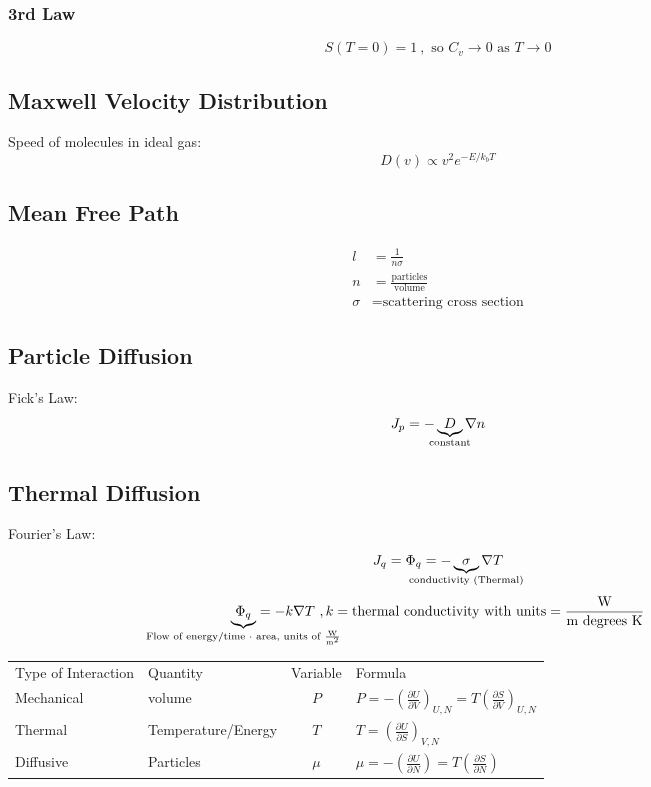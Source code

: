 \documentclass[10pt,letter]{article}
\begin{document}
\subsubsection{3rd Law}
\begin{equation}
 S(T=0) = 1 ~, \textrm{ so } C_v \rightarrow 0 \textrm{ as } T \rightarrow 0
\end{equation}


\subsection{Maxwell Velocity Distribution}
Speed of molecules in ideal gas:
\begin{equation}
 D(v) \propto v^2e^{-E/k_bT} 
\end{equation}

\subsection{Mean Free Path}
\begin{align}
l &= \frac{1}{n\sigma}\\
n &= \frac{\textrm{particles}}{\textrm{volume}}\\
\sigma &= \textrm{scattering cross section}
\end{align}

\subsection{Particle Diffusion}
Fick's Law:
\begin{equation}
 J_p = -\underbrace{D}_{\mathclap{\textrm{constant}}}\nabla n 
\end{equation}

\subsection{Thermal Diffusion}
Fourier's Law:
\begin{equation}
 J_q = \Phi_q = -\underbrace{\sigma}_{\mathclap{\textrm{conductivity (Thermal)}}}\nabla T
\end{equation}
\begin{equation}
 \underbrace{\Phi_q}_{\mathclap{\textrm{Flow of energy/time $\cdot$ area, units of $\frac{\textrm{W}}{\textrm{m}^2}$}}} = -k \nabla T~,k = \textrm{thermal conductivity with units}=\frac{\textrm{W}}{\textrm{m } \textrm{degrees K}}
\end{equation}

\begin{tabular}{l l c l}
Type of Interaction & Quantity & Variable & Formula \\
Mechanical & volume & $P$ & $P = - \left( \frac{\partial U}{\partial V} \right)_{U,N} = T \left( \frac{\partial S}{\partial V} \right)_{U,N} $\\
Thermal & Temperature/Energy & $T$ & $T = \left( \frac{\partial U}{\partial S} \right)_{V,N} $\\
Diffusive & Particles & $\mu$ & $\mu = - \left( \frac{\partial U}{\partial N} \right) = T \left( \frac{\partial S}{\partial N} \right)  $
\end{tabular}
\end{document}

